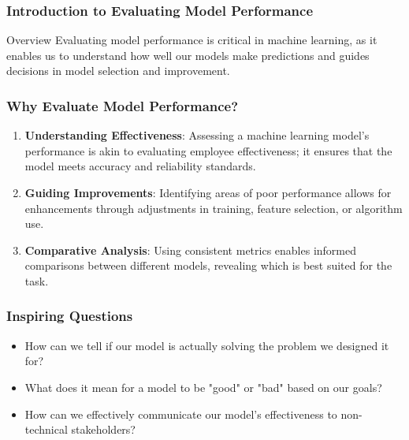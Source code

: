 \documentclass[aspectratio=169]{beamer}
\begin{document}
\frame{\titlepage}

\begin{frame}[fragile]
    \titlepage
\end{frame}

\begin{frame}[fragile]
    \frametitle{Introduction to Evaluating Model Performance}
    \begin{block}{Overview}
        Evaluating model performance is critical in machine learning, as it enables us to understand how well our models make predictions and guides decisions in model selection and improvement.
    \end{block}
\end{frame}

\begin{frame}[fragile]
    \frametitle{Why Evaluate Model Performance?}
    \begin{enumerate}
        \item \textbf{Understanding Effectiveness}:
            Assessing a machine learning model's performance is akin to evaluating employee effectiveness; it ensures that the model meets accuracy and reliability standards.
        
        \item \textbf{Guiding Improvements}:
            Identifying areas of poor performance allows for enhancements through adjustments in training, feature selection, or algorithm use.
        
        \item \textbf{Comparative Analysis}:
            Using consistent metrics enables informed comparisons between different models, revealing which is best suited for the task.
    \end{enumerate}
\end{frame}

\begin{frame}[fragile]
    \frametitle{Inspiring Questions}
    \begin{itemize}
        \item How can we tell if our model is actually solving the problem we designed it for?
        \item What does it mean for a model to be "good" or "bad" based on our goals?
        \item How can we effectively communicate our model's effectiveness to non-technical stakeholders?
    \end{itemize}
\end{frame}
\end{document}
